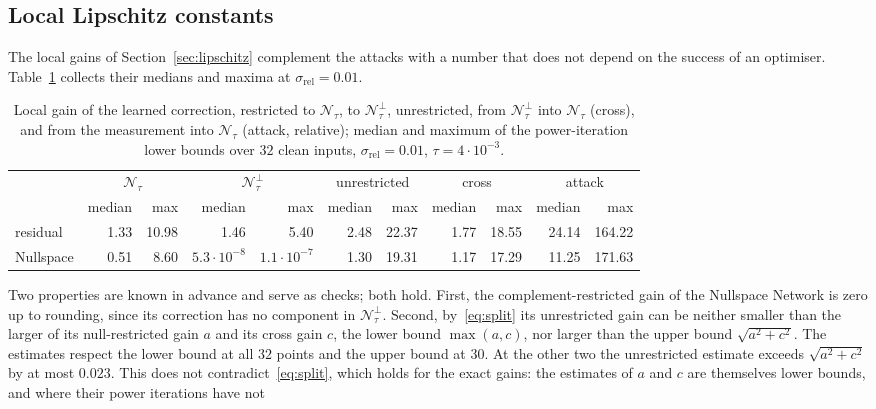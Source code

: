 \documentclass{article}
\numberwithin{equation}{section}
\begin{document}
\subsection{Local Lipschitz constants}\label{sec:results-lipschitz}
The local gains of Section~\ref{sec:lipschitz} complement the attacks with a number that does not
depend on the success of an optimiser. Table~\ref{tab:lipschitz} collects their medians and maxima at
$\sigma_\text{rel}=0.01$.
\begin{table}[htbp]
\centering
\caption{Local gain of the learned correction, restricted to $\mathcal{N}_\tau$, to
$\mathcal{N}_\tau^\perp$, unrestricted, from $\mathcal{N}_\tau^\perp$ into $\mathcal{N}_\tau$ (cross), and
from the measurement into $\mathcal{N}_\tau$ (attack, relative); median and maximum of the power-iteration
lower bounds over $32$ clean inputs, $\sigma_\text{rel}=0.01$, $\tau=4\cdot10^{-3}$.}\label{tab:lipschitz}
\scriptsize\setlength{\tabcolsep}{2.2pt}
\begin{tabular}{l rr rr rr rr rr}
\toprule
 & \multicolumn{2}{c}{$\mathcal{N}_\tau$} & \multicolumn{2}{c}{$\mathcal{N}_\tau^\perp$} & \multicolumn{2}{c}{unrestricted} & \multicolumn{2}{c}{cross} & \multicolumn{2}{c}{attack} \\
\cmidrule(lr){2-3}\cmidrule(lr){4-5}\cmidrule(lr){6-7}\cmidrule(lr){8-9}\cmidrule(lr){10-11}
 & median & max & median & max & median & max & median & max & median & max \\
\midrule
residual & 1.33 & 10.98 & 1.46 & 5.40 & 2.48 & 22.37 & 1.77 & 18.55 & 24.14 & 164.22 \\
Nullspace & 0.51 & 8.60 & $5.3\cdot10^{-8}$ & $1.1\cdot10^{-7}$ & 1.30 & 19.31 & 1.17 & 17.29 & 11.25 & 171.63 \\
\bottomrule
\end{tabular}
\end{table}
Two properties are known in advance and serve as checks; both hold. First, the
complement-restricted gain of the Nullspace Network is zero up to rounding, since its correction has no
component in $\mathcal{N}_\tau^\perp$. Second, by~\eqref{eq:split} its unrestricted gain can be neither
smaller than the larger of its null-restricted gain $a$ and its cross gain $c$, the lower bound
$\max(a,c)$, nor larger than the upper bound $\sqrt{a^2+c^2}$. The estimates respect the lower bound at all
$32$ points and the upper bound at $30$. At the other two the unrestricted estimate exceeds
$\sqrt{a^2+c^2}$ by at most $0.023$. This does not contradict~\eqref{eq:split}, which holds for the exact
gains: the estimates of $a$ and $c$ are themselves lower bounds, and where their power iterations have not
\end{document}
